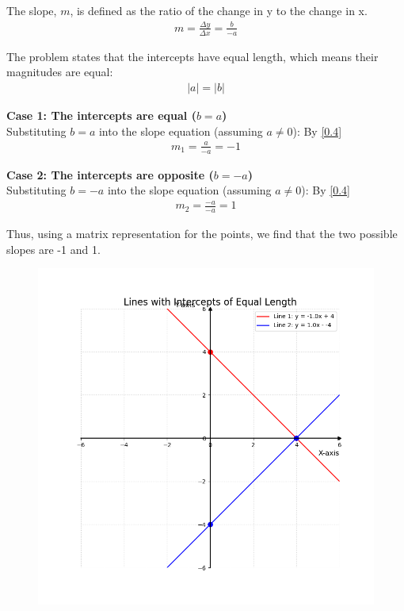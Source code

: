 \documentclass[journal]{IEEEtran}
\begin{document}
	The slope, $m$, is defined as the ratio of the change in y to the change in x.
	\begin{align}
		m = \frac{\Delta y}{\Delta x} = \frac{b}{-a} \label{0.4}
	\end{align}
	
	The problem states that the intercepts have equal length, which means their magnitudes are equal:
	\begin{align}
		|a| = |b|
	\end{align}
	
	\textbf{Case 1: The intercepts are equal ($b = a$)}\\
	Substituting $b=a$ into the slope equation (assuming $a \neq 0$):
	By \eqref{0.4}
	\begin{align}
		m_1 = \frac{a}{-a} = -1
	\end{align}
	
	\textbf{Case 2: The intercepts are opposite ($b = -a$)}\\
	Substituting $b=-a$ into the slope equation (assuming $a \neq 0$):
	By \eqref{0.4}
	\begin{align}
		m_2 = \frac{-a}{-a} = 1
	\end{align}
	
	Thus, using a matrix representation for the points, we find that the two possible slopes are -1 and 1.
	
	\begin{figure}[H]
		\centering
		\includegraphics[width = 0.8\columnwidth]{Figure_1.png}
		\caption*{}
		\label{fig1}
	\end{figure}
	
\end{document}
